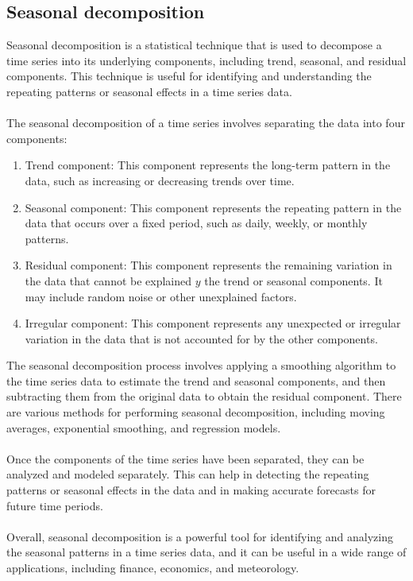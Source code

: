 \subsection{Seasonal decomposition}
Seasonal decomposition is a statistical technique that is used to decompose a time series into its underlying components,
including trend, seasonal, and residual components. This technique is useful for identifying and understanding
the repeating patterns or seasonal effects in a time series data.\\
\\
The seasonal decomposition of a time series involves separating the data into four components:
\begin{enumerate}
    \item Trend component: This component represents the long-term pattern in the data, such as increasing or
    decreasing trends over time.
    \item Seasonal component: This component represents the repeating pattern in the data that occurs over a fixed
    period, such as daily, weekly, or monthly patterns.
    \item Residual component: This component represents the remaining variation in the data that cannot be explained
    $y$ the trend or seasonal components. It may include random noise or other unexplained factors.
    \item Irregular component: This component represents any unexpected or irregular variation in the data that is not
    accounted for by the other components.
\end{enumerate}
The seasonal decomposition process involves applying a smoothing algorithm to the time series data to estimate the
trend and seasonal components, and then subtracting them from the original data to obtain the residual component.
There are various methods for performing seasonal decomposition, including moving averages, exponential smoothing,
and regression models.\\
\\
Once the components of the time series have been separated, they can be analyzed and modeled separately.
This can help in detecting the repeating patterns or seasonal effects in the data and in making accurate forecasts for
future time periods.\\
\\
Overall, seasonal decomposition is a powerful tool for identifying and analyzing the seasonal patterns in a time series
data, and it can be useful in a wide range of applications, including finance, economics, and meteorology.\\

